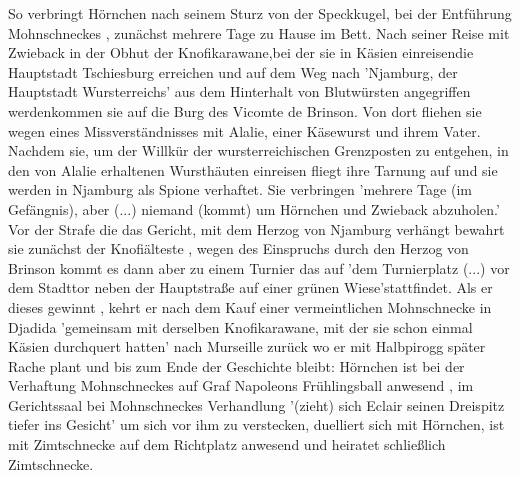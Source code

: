 So verbringt Hörnchen nach seinem Sturz von der Speckkugel, bei der Entführung Mohnschneckes \cite[S.34]{pir}, zunächst mehrere Tage zu Hause im Bett. \cite[7. Kapitel]{pir}\cite[S.82]{pir} Nach seiner Reise mit Zwieback in der Obhut der Knofikarawane,\cite[S.124ff]{pir}bei der sie in Käsien einreisen\cite[S.140]{pir}die Hauptstadt Tschiesburg erreichen\cite[S.164ff]{pir} und auf dem Weg nach 'Njamburg, der Hauptstadt Wursterreichs'\cite[S.218]{pir} aus dem Hinterhalt von Blutwürsten angegriffen werden\cite[S.224ff]{pir}kommen sie auf die Burg des Vicomte de Brinson.\cite[S.233]{pir} Von dort fliehen sie\cite[S.239ff]{pir} wegen eines Missverständnisses mit Alalie, einer Käsewurst\cite[S.230f]{pir} und ihrem Vater.\cite[S.233ff]{pir} Nachdem sie, um der Willkür der wursterreichischen Grenzposten zu entgehen, \cite[S.285]{pir} in den von Alalie erhaltenen Wursthäuten\cite[S.242]{pir} einreisen \cite[S.287f]{pir}fliegt ihre Tarnung auf \cite[S.293]{pir} und sie werden in Njamburg\cite[S.289ff]{pir} als Spione verhaftet. \cite[S.293]{pir} Sie verbringen 'mehrere Tage (im Gefängnis), aber (...) niemand (kommt) um Hörnchen und Zwieback abzuholen.'\cite[S.322]{pir} Vor der Strafe die das Gericht, mit dem Herzog von Njamburg\cite[S.324ff]{pir} verhängt bewahrt sie zunächst der Knofiälteste \cite[S.327]{pir}, wegen des Einspruchs durch den Herzog von Brinson \cite[S.332]{pir} kommt es dann aber zu einem Turnier \cite[S.335ff]{pir} das auf 'dem Turnierplatz (...) vor dem Stadttor neben der Hauptstraße auf einer grünen Wiese'\cite[S.343]{pir}stattfindet. Als er dieses gewinnt \cite[S.357]{pir}, kehrt er nach dem Kauf einer vermeintlichen Mohnschnecke in Djadida \cite[S.388ff]{pir} 'gemeinsam mit derselben Knofikarawane, mit der sie schon einmal Käsien durchquert hatten' \cite[S.506]{pir} nach Murseille zurück \cite[S.506]{pir} wo er mit Halbpirogg später Rache plant \cite[S.540ff]{pir} und bis zum Ende der Geschichte bleibt: Hörnchen ist bei der Verhaftung Mohnschneckes auf Graf Napoleons Frühlingsball anwesend \cite[S.549ff]{pir}, im Gerichtssaal bei Mohnschneckes Verhandlung '(zieht) sich Eclair seinen Dreispitz tiefer ins Gesicht' \cite[S.570]{pir} um sich vor  ihm zu verstecken, duelliert sich mit Hörnchen,\cite[S.594]{pir} ist mit Zimtschnecke auf dem Richtplatz anwesend\cite[S.609]{pir} und heiratet schließlich Zimtschnecke. \cite[S.644]{pir}

